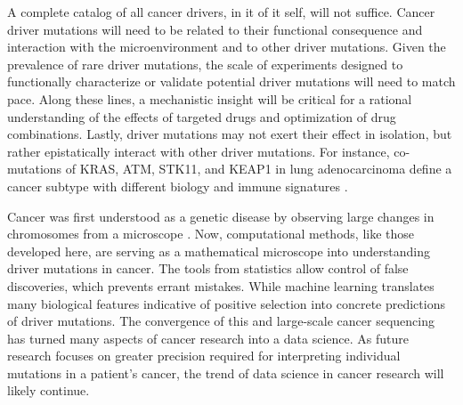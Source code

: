 A complete catalog of all cancer drivers, in it of it self, will not suffice. Cancer driver mutations will need to be related to their functional consequence and interaction with the microenvironment and to other driver mutations. Given the prevalence of rare driver mutations, the scale of experiments designed to functionally characterize or validate potential driver mutations will need to match pace. Along these lines, a mechanistic insight will be critical for a rational understanding of the effects of targeted drugs and optimization of drug combinations. Lastly, driver mutations may not exert their effect in isolation, but rather epistatically interact with other driver mutations. For instance, co-mutations of KRAS, ATM, STK11, and KEAP1 in lung adenocarcinoma define a cancer subtype with different biology and immune signatures \cite{RN191}.

Cancer was first understood as a genetic disease by observing large changes in chromosomes from a microscope \cite{RN18}. Now, computational methods, like those developed here, are serving as a mathematical microscope into understanding driver mutations in cancer. The tools from statistics allow control of false discoveries, which prevents errant mistakes. While machine learning translates many biological features indicative of positive selection into concrete predictions of driver mutations. The convergence of this and large-scale cancer sequencing has turned many aspects of cancer research into a data science. As future research focuses on greater precision required for interpreting individual mutations in a patient's cancer, the trend of data science in cancer research will likely continue.
